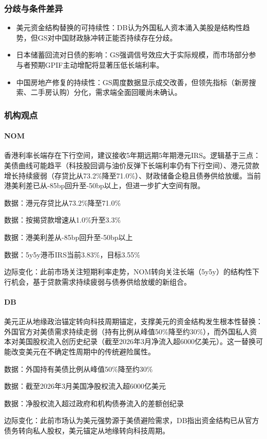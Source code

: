 \documentclass[11pt]{ctexart}
\begin{document}
\subsubsection*{分歧与条件差异}
\begin{itemize}
  \item 美元资金结构替换的可持续性：DB认为外国私人资本涌入美股是结构性趋势，但GS对中国财政脉冲转正能否持续存在分歧。
  \item 日本储蓄回流对日债的影响：GS强调信号效应大于实际规模，而市场部分参与者预期GPIF主动增配将显著压低长端利率。
  \item 中国房地产修复的持续性：GS周度数据显示成交改善，但领先指标（新房搜索、二手房认购）分化，需求端全面回暖尚未确认。
\end{itemize}
\subsubsection*{机构观点}
\paragraph{NOM} 香港利率长端存在下行空间，建议接收5年期远期5年期港元IRS。逻辑基于三点：美债曲线可能趋平（科技股回调与油价反弹下长端利率仍有下行空间）、港元贷款增长持续疲弱（存贷比从73.2\%降至71.0\%）、财政储备企稳且债券供给放缓。当前港美利差已从-85bp回升至-50bp以上，但进一步扩大空间有限。
{\small\color{refgray}数据：港元存贷比从73.2\%降至71.0\%\par}
{\small\color{refgray}数据：按揭贷款增速从1.0\%升至3.3\%\par}
{\small\color{refgray}数据：港美利差从-85bp回升至-50bp以上\par}
{\small\color{refgray}数据：5y5y港币IRS当前3.83\%，目标3.55\%\par}
{\small\color{refgray}边际变化：此前市场关注短期利率走势，NOM转向关注长端（5y5y）的结构性下行机会，基于贷款需求持续疲弱与债券供给放缓的新组合。\par}
\paragraph{DB} 美元正从地缘政治锚定转向科技周期锚定，支撑美元的资金结构发生根本性替换：外国官方对美债需求持续走弱（持有比例从峰值50\%降至约30\%），而外国私人资本对美国股权流入创历史纪录（截至2026年3月净流入超6000亿美元）。这一替换可能改变美元在不确定性周期中的传统避险属性。
{\small\color{refgray}数据：外国持有美债比例从峰值50\%降至约30\%\par}
{\small\color{refgray}数据：截至2026年3月美国净股权流入超6000亿美元\par}
{\small\color{refgray}数据：净股权流入超过政府和机构债券流入的差额创纪录\par}
{\small\color{refgray}边际变化：此前市场认为美元强势源于美债避险需求，DB指出资金结构已从官方债务转向私人股权，美元锚定从地缘转向科技周期。\par}
\end{document}

